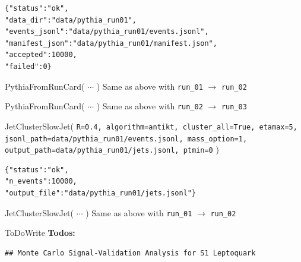 \documentclass[11pt,oneside]{article}
\numberwithin{equation}{section}
\begin{document}
\begin{orchestralagentmessage}
\begin{orchestraltoolmessageml}
\begin{verbatim}
{"status":"ok",
"data_dir":"data/pythia_run01",
"events_jsonl":"data/pythia_run01/events.jsonl",
"manifest_json":"data/pythia_run01/manifest.json",
"accepted":10000,
"failed":0}
\end{verbatim}
    \end{orchestraltoolmessageml}


    \begin{orchestraltoolmessage}{PythiaFromRunCard( $\cdots$ )}
        Same as above with \texttt{run\_01} $\to$ \texttt{run\_02}
    \end{orchestraltoolmessage}

    \begin{orchestraltoolmessage}{PythiaFromRunCard( $\cdots$ )}
        Same as above with \texttt{run\_02} $\to$ \texttt{run\_03}
    \end{orchestraltoolmessage}


    \begin{orchestraltoolmessageml}{JetClusterSlowJet( \texttt{R=0.4, algorithm=antikt, cluster\_all=True, etamax=5,}\\\hphantom{JetClusterSlowJet(}
         \texttt{jsonl\_path=data/pythia\_run01/events.jsonl, mass\_option=1,}\\\hphantom{JetClusterSlowJet(} \texttt{output\_path=data/pythia\_run01/jets.jsonl, ptmin=0} )}
\begin{verbatim}
{"status":"ok",
"n_events":10000,
"output_file":"data/pythia_run01/jets.jsonl"}
\end{verbatim}
    \end{orchestraltoolmessageml}

    \begin{orchestraltoolmessage}{JetClusterSlowJet( $\cdots$ )}
        Same as above with \texttt{run\_01} $\to$ \texttt{run\_02}
    \end{orchestraltoolmessage}

    \begin{orchestraltoolmessage}{ToDoWrite}
        \textbf{Todos:}\vspace{-0.2in}

\begin{verbatim}
## Monte Carlo Signal‑Validation Analysis for S1 Leptoquark


\end{verbatim}
\end{orchestraltoolmessage}
\end{orchestralagentmessage}
\end{document}
